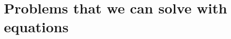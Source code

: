 \documentclass[aspectratio=169,mathserif,notheorems]{beamer}%
\begin{document}
\section{Problems that we can solve with equations}%
%
%
%
%
%
%
%
\protected\gdef\aRectangle{{\color{rectangle-color}{\ensuremath{A_{\text{\ding{122}}}}}}}%
\protected\gdef\aRectangleDiff{{\color{rectangle-color}{\ensuremath{A'_{\text{\ding{122}}}}}}}%
\protected\gdef\aRectangleMax{{\color{rectangle-color}{\ensuremath{\widehat{A_{\text{\ding{122}}}}}}}}%
\protected\gdef\aSquare{{\color{square-color}{\ensuremath{A_{\text{\ding{110}}}}}}}%
\protected\gdef\aSmallTriangle{{\color{small-triangle-color}{\ensuremath{A_{\text{\ding{116}}}}}}}%
\protected\gdef\aLargeTriangle{{\color{large-triangle-color}{\ensuremath{A_{\text{\ding{115}}}}}}}%
\protected\gdef\aX{{\color{x-color}{\ensuremath{x}}}}%
\protected\gdef\aXMax{{\color{x-color}{\ensuremath{\hat{x}}}}}%
\protected\gdef\aRectangleOfX{\ensuremath{\aRectangle(\aX)}}%
\protected\gdef\aRectangleOfXDiff{\ensuremath{\aRectangleDiff(\aX)}}%
%
\end{document}
